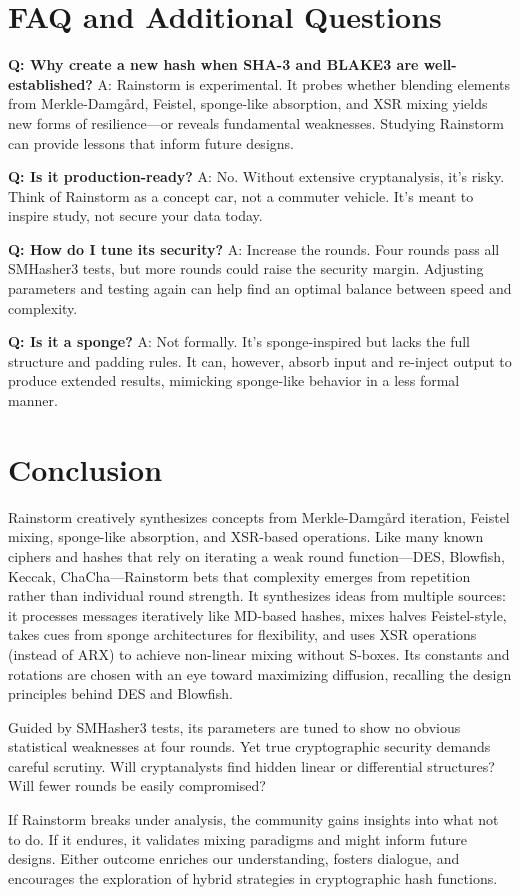 \documentclass[11pt,a4paper]{article}
\begin{document}
\section*{FAQ and Additional Questions}

\textbf{Q: Why create a new hash when SHA-3 and BLAKE3 are well-established?}  
A: Rainstorm is experimental. It probes whether blending elements from Merkle-Damg{\aa}rd, Feistel, sponge-like absorption, and XSR mixing yields new forms of resilience—or reveals fundamental weaknesses. Studying Rainstorm can provide lessons that inform future designs.

\textbf{Q: Is it production-ready?}  
A: No. Without extensive cryptanalysis, it’s risky. Think of Rainstorm as a concept car, not a commuter vehicle. It’s meant to inspire study, not secure your data today.

\textbf{Q: How do I tune its security?}  
A: Increase the rounds. Four rounds pass all SMHasher3 tests, but more rounds could raise the security margin. Adjusting parameters and testing again can help find an optimal balance between speed and complexity.

\textbf{Q: Is it a sponge?}  
A: Not formally. It’s sponge-inspired but lacks the full structure and padding rules. It can, however, absorb input and re-inject output to produce extended results, mimicking sponge-like behavior in a less formal manner.

\section*{Conclusion}
Rainstorm creatively synthesizes concepts from Merkle-Damg{\aa}rd iteration, Feistel mixing, sponge-like absorption, and XSR-based operations. Like many known ciphers and hashes that rely on iterating a weak round function—DES, Blowfish, Keccak, ChaCha—Rainstorm bets that complexity emerges from repetition rather than individual round strength. It synthesizes ideas from multiple sources: it processes messages iteratively like MD-based hashes, mixes halves Feistel-style, takes cues from sponge architectures for flexibility, and uses XSR operations (instead of ARX) to achieve non-linear mixing without S-boxes. Its constants and rotations are chosen with an eye toward maximizing diffusion, recalling the design principles behind DES and Blowfish.

Guided by SMHasher3 tests, its parameters are tuned to show no obvious statistical weaknesses at four rounds. Yet true cryptographic security demands careful scrutiny. Will cryptanalysts find hidden linear or differential structures? Will fewer rounds be easily compromised?

If Rainstorm breaks under analysis, the community gains insights into what not to do. If it endures, it validates mixing paradigms and might inform future designs. Either outcome enriches our understanding, fosters dialogue, and encourages the exploration of hybrid strategies in cryptographic hash functions.
\end{document}
